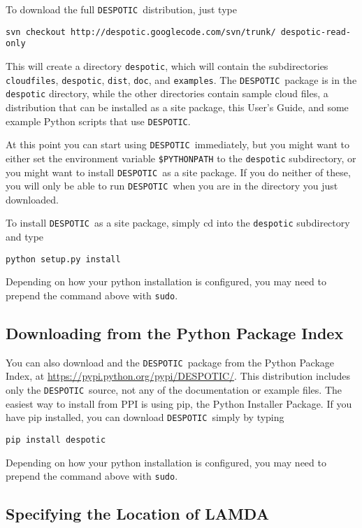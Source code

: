 \documentclass[12pt]{article}
\newcommand{\despotic}{\texttt{DESPOTIC}}
\begin{document}
To download the full \despotic\ distribution, just type

\begin{verbatim}
svn checkout http://despotic.googlecode.com/svn/trunk/ despotic-read-only
\end{verbatim}

This will create a directory \verb=despotic=, which will contain the subdirectories \verb=cloudfiles=, \verb=despotic=, \verb=dist=, \verb=doc=, and \verb=examples=. The \despotic\ package is in the \verb=despotic= directory, while the other directories contain sample cloud files, a distribution that can be installed as a site package, this User's Guide, and some example Python scripts that use \despotic.

At this point you can start using \despotic\ immediately, but you might want to either set the environment variable \verb=$PYTHONPATH= to the \verb=despotic= subdirectory, or you might want to install \despotic\ as a site package. If you do neither of these, you will only be able to run \despotic\ when you are in the directory you just downloaded.

To install \despotic\ as a site package, simply cd into the \verb=despotic= subdirectory and type
\begin{verbatim}
python setup.py install
\end{verbatim}
Depending on how your python installation is configured, you may need to prepend the command above with \verb=sudo=.

\subsection{Downloading from the Python Package Index}

You can also download and the \despotic\ package from the Python Package Index, at \url{https://pypi.python.org/pypi/DESPOTIC/}. This distribution includes only the \despotic\ source, not any of the documentation or example files. The easiest way to install from PPI is using pip, the Python Installer Package. If you have pip installed, you can download \despotic\ simply by typing
\begin{verbatim}
pip install despotic
\end{verbatim}
Depending on how your python installation is configured, you may need to prepend the command above with \verb=sudo=.


\subsection{Specifying the Location of LAMDA}
\end{document}
